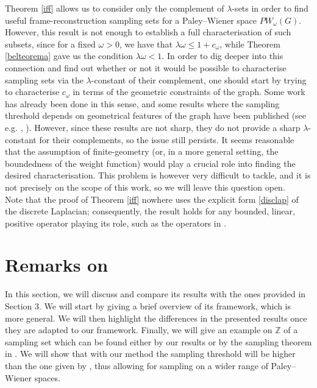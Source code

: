 \documentclass[12pt]{amsart}
\theoremstyle{definition}
\numberwithin{equation}{section}
\theoremstyle{definition}
\theoremstyle{remark}
\numberwithin{equation}{section}
\begin{document}
Theorem \ref{iff} allows us to consider only the complement of $\lambda$-sets in order to find useful frame-reconstruction sampling sets for a Paley--Wiener space $PW_\omega(G)$. However, this result is not enough to establish a full characterisation of such subsets, since for a fixed $\omega >0$, we have that $\lambda\omega \leq 1+ c_\omega$, while Theorem \ref{belteorema} gave us the condition $\lambda\omega<1$. In order to dig deeper into this connection and find out whether or not it would be possible to characterise sampling sets via the $\lambda$-constant of their complement, one should start by trying to characterise $c_\omega$ in terms of the geometric constraints of the graph. Some work has already been done in this sense, and some results where the sampling threshold depends on geometrical features of the graph have been published (see e.g. \cite{FP}, \cite{PP1}). However, since these results are not sharp, they do not provide a sharp $\lambda$-constant for their complements, so the issue still persists. It seems reasonable that the assumption of finite-geometry (or, in a more general setting, the boundedness of the weight function) would play a crucial role into finding the desired characterisation. This problem is however very difficult to tackle, and it is not precisely on the scope of this work, so we will leave this question open.\\
Note that the proof of Theorem \ref{iff} nowhere uses the explicit form \ref{disclap} of the discrete Laplacian; consequently, the result holds for any bounded, linear, positive operator playing its role, such as the operators in \cite{FP}.


\section{Remarks on \cite{FP}}
In this section, we will discuss \cite{FP} and compare its results with the ones provided in Section 3. We will start by giving a brief overview of its framework, which is more general. We will then highlight the differences in the presented results once they are adapted to our framework. Finally, we will give an example on $\mathbb{Z}$ of a sampling set which can be found either by our results or by the sampling theorem in \cite{FP}. We will show that with our method the sampling threshold will be higher than the one given by \cite{FP}, thus allowing for sampling on a wider range of Paley--Wiener spaces.
\end{document}
